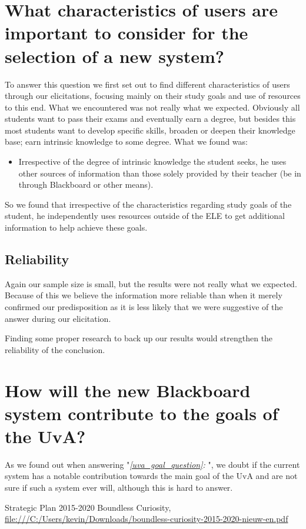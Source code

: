 \section{What characteristics of users are important to consider for the selection of a new system?}
To answer this question we first set out to find different characteristics of users through our elicitations, focusing mainly on their study goals and use of resources to this end. What we encountered was not really what we expected. Obviously all students want to pass their exams and eventually earn a degree, but besides this most students want to develop specific skills, broaden or deepen their knowledge base; earn intrinsic knowledge to some degree. What we found was:
\begin{itemize}
	\item Irrespective of the degree of intrinsic knowledge the student seeks, he uses other sources of information than those solely provided by their teacher (be in through Blackboard or other means).
\end{itemize}

So we found that irrespective of the characteristics regarding study goals of the student, he independently uses resources outside of the ELE to get additional information to help achieve these goals.

\subsection{Reliability}
Again our sample size is small, but the results were not really what we expected. Because of this we believe the information more reliable than when it merely confirmed our predisposition as it is less likely that we were suggestive of the answer during our elicitation.

Finding some proper research to back up our results would strengthen the reliability of the conclusion. 


\section{How will the new Blackboard system contribute to the goals of the UvA?}
As we found out when answering "\emph{\ref{uva_goal_question}: }", we doubt if the current system has a notable contribution towards the main goal of the UvA and are not sure if such a system ever will, although this is hard to answer.

{Strategic Plan 2015-2020 Boundless Curiosity},
	\url{file:///C:/Users/kevin/Downloads/boundless-curiosity-2015-2020-nieuw-en.pdf}


